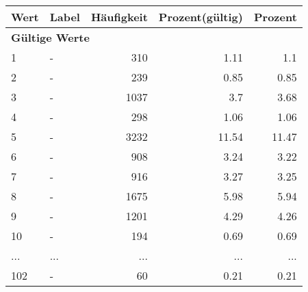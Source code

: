      \begin{longtable}{lXrrr}
     \toprule
     \textbf{Wert} & \textbf{Label} & \textbf{Häufigkeit} & \textbf{Prozent(gültig)} & \textbf{Prozent} \\
     \endhead
     \midrule
     \multicolumn{5}{l}{\textbf{Gültige Werte}}\\
        1 & \multicolumn{1}{X}{-} & %
          \num{310} &
          \num[round-mode=places,round-precision=2]{1,11} &
          \num[round-mode=places,round-precision=2]{1,1} \\
        2 & \multicolumn{1}{X}{-} & %
          \num{239} &
          \num[round-mode=places,round-precision=2]{0,85} &
          \num[round-mode=places,round-precision=2]{0,85} \\
        3 & \multicolumn{1}{X}{-} & %
          \num{1037} &
          \num[round-mode=places,round-precision=2]{3,7} &
          \num[round-mode=places,round-precision=2]{3,68} \\
        4 & \multicolumn{1}{X}{-} & %
          \num{298} &
          \num[round-mode=places,round-precision=2]{1,06} &
          \num[round-mode=places,round-precision=2]{1,06} \\
        5 & \multicolumn{1}{X}{-} & %
          \num{3232} &
          \num[round-mode=places,round-precision=2]{11,54} &
          \num[round-mode=places,round-precision=2]{11,47} \\
        6 & \multicolumn{1}{X}{-} & %
          \num{908} &
          \num[round-mode=places,round-precision=2]{3,24} &
          \num[round-mode=places,round-precision=2]{3,22} \\
        7 & \multicolumn{1}{X}{-} & %
          \num{916} &
          \num[round-mode=places,round-precision=2]{3,27} &
          \num[round-mode=places,round-precision=2]{3,25} \\
        8 & \multicolumn{1}{X}{-} & %
          \num{1675} &
          \num[round-mode=places,round-precision=2]{5,98} &
          \num[round-mode=places,round-precision=2]{5,94} \\
        9 & \multicolumn{1}{X}{-} & %
          \num{1201} &
          \num[round-mode=places,round-precision=2]{4,29} &
          \num[round-mode=places,round-precision=2]{4,26} \\
        10 & \multicolumn{1}{X}{-} & %
          \num{194} &
          \num[round-mode=places,round-precision=2]{0,69} &
          \num[round-mode=places,round-precision=2]{0,69} \\
       ... & ... & ... & ... & ... \\
        102 & \multicolumn{1}{X}{-} & %
          \num{60} &
          \num[round-mode=places,round-precision=2]{0,21} &
          \num[round-mode=places,round-precision=2]{0,21} \\


\end{longtable}
